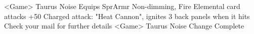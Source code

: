 <Game> Taurus Noise 
Equips SprArmr 
Non-dimming, Fire Elemental card attacks +50 
Charged attack: "Heat Cannon", ignites 3 back panels when it hits 
Check your mail for further details 
<Game> Taurus Noise Change Complete 
